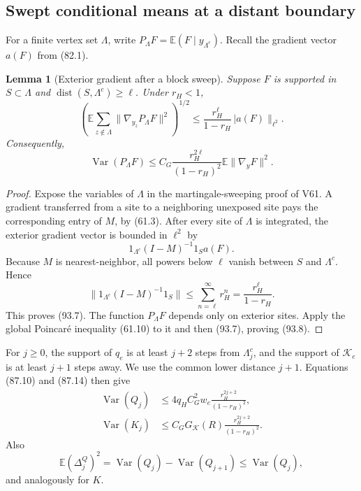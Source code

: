 \documentclass[11pt]{article}
\newtheorem{lemma}[theorem]{Lemma}
\theoremstyle{remark}
\begin{document}
\subsection{Swept conditional means at a distant boundary}

For a finite vertex set \(\Lambda\), write
\(P_\Lambda F=\mathbb E(F\mid y_{\Lambda^c})\).  Recall the gradient
vector \(a(F)\) from (82.1).

\begin{lemma}[Exterior gradient after a block sweep]
\label{lem:v17v93-block-sweep}
Suppose \(F\) is supported in \(S\subset\Lambda\) and
\(\operatorname{dist}(S,\Lambda^c)\geq\ell\).  Under \(r_H<1\),
\[
\boxed{
 \left(
  \mathbb E\sum_{z\notin\Lambda}
  \|\nabla_{y_z}P_\Lambda F\|^2
 \right)^{1/2}
 \leq\frac{r_H^\ell}{1-r_H}\,|a(F)\|_{\ell^2}.}   \tag{93.7}
\]
Consequently,
\[
 \operatorname{Var}(P_\Lambda F)
 \leq C_G\frac{r_H^{2\ell}}{(1-r_H)^2}
          \mathbb E\|\nabla_yF\|^2.                 \tag{93.8}
\]
\end{lemma}

\begin{proof}
Expose the variables of \(\Lambda\) in the martingale-sweeping proof
of V61.  A gradient transferred from a site to a neighboring
unexposed site pays the corresponding entry of \(M\), by (61.3).
After every site of \(\Lambda\) is integrated, the exterior gradient
vector is bounded in \(\ell^2\) by
\[
 1_{\Lambda^c}(I-M)^{-1}1_Sa(F).                    \tag{93.9}
\]
Because \(M\) is nearest-neighbor, all powers below \(\ell\) vanish
between \(S\) and \(\Lambda^c\).  Hence
\[
 \|1_{\Lambda^c}(I-M)^{-1}1_S\|
 \leq\sum_{n=\ell}^\infty r_H^n
 =\frac{r_H^\ell}{1-r_H}.                           \tag{93.10}
\]
This proves (93.7).  The function \(P_\Lambda F\) depends only on
exterior sites.  Apply the global Poincar\'e inequality (61.10) to it
and then (93.7), proving (93.8).
\end{proof}

For \(j\geq0\), the support of \(q_e\) is at least \(j+2\) steps from
\(\Lambda_j^c\), and the support of \(\mathcal K_e\) is at least
\(j+1\) steps away.  We use the common lower distance \(j+1\).
Equations (87.10) and (87.14) then give
\[
\begin{aligned}
 \operatorname{Var}(Q_j)
 &\leq4q_HC_G^2w_e
       \frac{r_H^{2j+2}}{(1-r_H)^2},\\
 \operatorname{Var}(K_j)
 &\leq C_GG_{\mathcal K}(R)
       \frac{r_H^{2j+2}}{(1-r_H)^2}.                \tag{93.11}
\end{aligned}
\]
Also
\[
 \mathbb E(\Delta_j^Q)^2
 =\operatorname{Var}(Q_j)-\operatorname{Var}(Q_{j+1})
 \leq\operatorname{Var}(Q_j),                      \tag{93.12}
\]
and analogously for \(K\).
\end{document}

